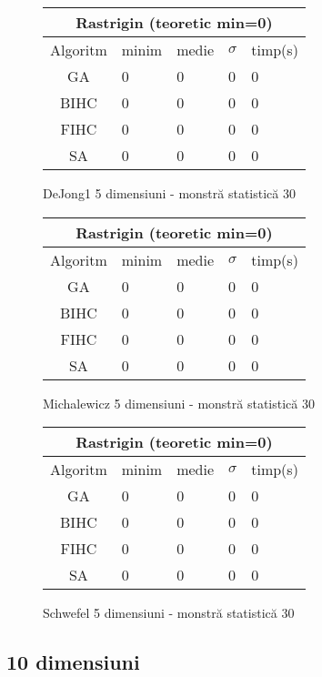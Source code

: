 \documentclass{article}
\begin{document}
\begin{figure}[!h]
\begin{tabular}{||c|||l|l|l|l||}
  \hline
  \multicolumn{5}{||c||}{Rastrigin (teoretic min=0)} \\ \hline
  Algoritm & minim & medie & $\sigma$ & timp(s) \\ \hline \hline
  GA & 0 & 0 & 0 & 0 \\ \hline
  BIHC & 0 & 0 & 0 & 0\\ \hline
  FIHC & 0 & 0 & 0 & 0 \\ \hline
  SA & 0 & 0 & 0 & 0 \\ \hline
\end{tabular}
\caption{DeJong1 5 dimensiuni - monstră statistică 30} 
\end{figure}

\begin{figure}[!h]
\begin{tabular}{||c|||l|l|l|l||}
  \hline
  \multicolumn{5}{||c||}{Rastrigin (teoretic min=0)} \\ \hline
  Algoritm & minim & medie & $\sigma$ & timp(s) \\ \hline \hline
  GA & 0 & 0 & 0 & 0 \\ \hline
  BIHC & 0 & 0 & 0 & 0\\ \hline
  FIHC & 0 & 0 & 0 & 0 \\ \hline
  SA & 0 & 0 & 0 & 0 \\ \hline
\end{tabular}
\caption{Michalewicz 5 dimensiuni - monstră statistică 30} 
\end{figure}

\begin{figure}[!h]
\begin{tabular}{||c|||l|l|l|l||}
  \hline
  \multicolumn{5}{||c||}{Rastrigin (teoretic min=0)} \\ \hline
  Algoritm & minim & medie & $\sigma$ & timp(s) \\ \hline \hline
  GA & 0 & 0 & 0 & 0 \\ \hline
  BIHC & 0 & 0 & 0 & 0\\ \hline
  FIHC & 0 & 0 & 0 & 0 \\ \hline
  SA & 0 & 0 & 0 & 0 \\ \hline
\end{tabular}
\caption{Schwefel 5 dimensiuni - monstră statistică 30} 
\end{figure}

\clearpage
\subsection{10 dimensiuni}
\end{document}
